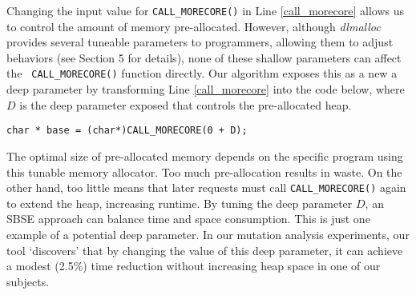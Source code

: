 Changing the input value for {\tt CALL\_MORECORE()} in Line
\ref{call_morecore} allows us to control the amount of memory
pre-allocated. However, although \emph{dlmalloc} provides several tuneable
parameters to programmers, allowing them to adjust behaviors (see Section 5
for details), none of these shallow parameters can affect the {\tt
CALL\_MORECORE()} function directly. Our algorithm exposes this as a new
a deep parameter by 
transforming Line \ref{call_morecore} into
the code below, where $D$ is the deep parameter exposed that controls the
pre-allocated heap.

\begin{lstlisting}
char * base = (char*)CALL_MORECORE(0 + D);
\end{lstlisting}

The optimal size of pre-allocated memory depends on the specific program using this tunable memory allocator. Too much pre-allocation results in waste. On the other hand, too little means that later requests must call {\tt CALL\_MORECORE()} again to extend the heap, increasing runtime. By tuning the deep parameter $D$, an SBSE approach can balance time and space consumption. This is just one example of a potential deep parameter. In our mutation analysis experiments, our tool `discovers' that by changing the value of this deep parameter, it can achieve a modest (2.5\%) time reduction without increasing heap space in one of our subjects.

